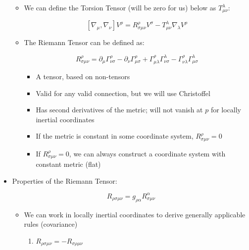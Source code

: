 \begin{itemize}
\begin{itemize}
      \item We can define the Torsion Tensor (will be zero for us) below as $T^{\lambda}_{\mu\nu}$:

        $$[\nabla_{\mu},\nabla_{\nu}]V^{\rho}=R^{\rho}_{\sigma\mu\nu}V^{\sigma}-T^{\lambda}_{\mu\nu}\nabla_{\lambda}V^{\rho}$$

      \item The Riemann Tensor can be defined as:

        $$R^{\rho}_{\sigma\mu\nu}=\partial_{\mu}\Gamma^{\rho}_{\nu\sigma}-\partial_{\nu}\Gamma^{\rho}_{\mu\sigma}+\Gamma^{\rho}_{\mu\lambda}\Gamma^{\lambda}_{\nu\sigma}-\Gamma^{\rho}_{\nu\lambda}\Gamma^{\lambda}_{\mu\sigma}$$

        \begin{itemize}

          \item A tensor, based on non-tensors

          \item Valid for any valid connection, but we will use Christoffel

          \item Has second derivatives of the metric; will not vanish at $p$ for locally inertial coordinates

          \item If the metric is constant in some coordinate system, $R^{\rho}_{\sigma\mu\nu}=0$

          \item If $R^{\rho}_{\sigma\mu\nu}=0$, we can always construct a coordinate system with constant metric (flat)

        \end{itemize}

    \end{itemize}

  \item Properties of the Riemann Tensor:

    $$R_{\rho\sigma\mu\nu}=g_{\rho\alpha}R^{\alpha}_{\sigma\mu\nu}$$

    \begin{itemize}

      \item We can work in locally inertial coordinates to derive generally applicable rules (covariance)

        \begin{enumerate}

          \item $R_{\rho\sigma\mu\nu}=-R_{\sigma\rho\mu\nu}$


\end{enumerate}
\end{itemize}
\end{itemize}
